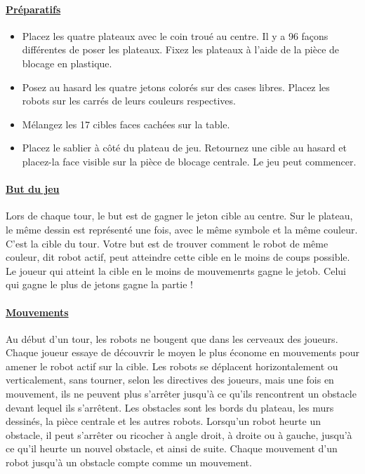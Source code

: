 \documentclass[12pt]{article}
\begin{document}
	\paragraph{\underline{Préparatifs}}
	\begin{itemize}
		\item Placez les quatre plateaux avec le coin troué au centre. Il y a 96 façons différentes de poser
		les plateaux. Fixez les plateaux à l’aide de la pièce de blocage en plastique.
		\item Posez au hasard les quatre jetons colorés sur des cases libres. Placez les robots sur les
		carrés de leurs couleurs respectives.
		\item Mélangez les 17 cibles faces cachées sur la table.
		\item Placez le sablier à côté du plateau de jeu. Retournez une cible au hasard et placez-la face
		visible sur la pièce de blocage centrale. Le jeu peut commencer.
	\end{itemize}
	\paragraph{\underline{But du jeu}\\} 
	Lors de chaque tour, le but est de gagner le jeton cible au centre. Sur le plateau, le même dessin
	est représenté une fois, avec le même symbole et la même couleur. C’est la cible du tour. Votre
	but est de trouver comment le robot de même couleur, dit robot actif, peut atteindre cette cible en
	le moins de coups possible. Le joueur qui atteint la cible en le moins de mouvemenrts gagne le jetob. Celui qui
	gagne le plus de jetons gagne la partie !

	\paragraph{\underline{Mouvements}\\}
	Au début d’un tour, les robots ne bougent que dans les cerveaux des joueurs. Chaque joueur
	essaye de découvrir le moyen le plus économe en mouvements pour amener le robot actif sur la
	cible. Les robots se déplacent horizontalement ou verticalement, sans tourner, selon les directives
	des joueurs, mais une fois en mouvement, ils ne peuvent plus s’arrêter jusqu’à ce qu’ils
	rencontrent un obstacle devant lequel ils s’arrêtent. Les obstacles sont les bords du plateau, les
	murs dessinés, la pièce centrale et les autres robots. Lorsqu’un robot heurte un obstacle, il peut
	s’arrêter ou ricocher à angle droit, à droite ou à gauche, jusqu’à ce qu’il heurte un nouvel obstacle,
	et ainsi de suite.
	Chaque mouvement d’un robot jusqu’à un obstacle compte comme un mouvement.
	
\end{document}
